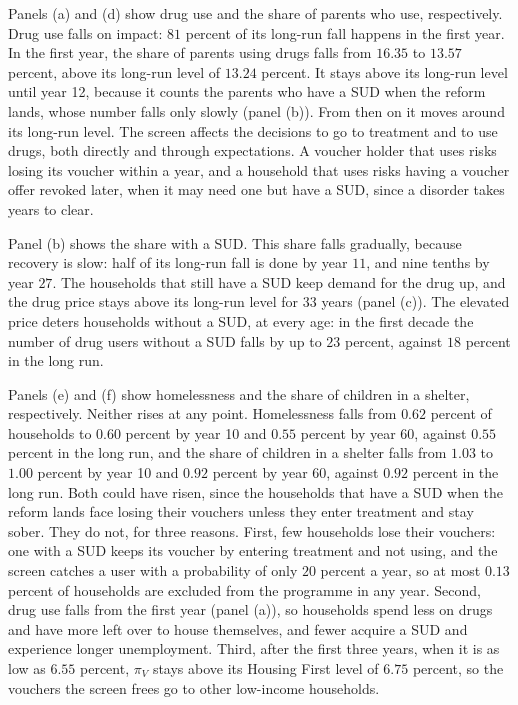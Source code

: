 \documentclass[10pt]{article}
\newif\ifshowupdates \showupdatesfalse
\newcommand{\updnum}[1]{\ifshowupdates{\color{blue}#1}\else#1\fi}
\begin{document}
Panels (a) and (d) show drug use and the share of parents who use, respectively. Drug use falls on impact: \updnum{$81$} percent of its long-run fall happens in
the first year. In the first year, the share of parents using drugs falls from \updnum{$16.35$} to \updnum{$13.57$} percent, \updnum{above} its long-run level of \updnum{$13.24$} percent. \updnum{It stays above its long-run level until year 12, because it counts the parents who have a SUD when the reform lands, whose number falls only slowly (panel (b)). From then on it moves around its long-run level.} The screen affects the decisions to go to treatment and to use drugs, both directly and through expectations. A voucher holder that uses risks losing its voucher within a year, and a household that uses risks having a voucher offer revoked later, when it may need one but have a SUD, since a disorder takes years to clear.

Panel (b) shows the
share with a SUD. This share falls gradually, because recovery is slow: half of its
long-run fall is done by year \updnum{$11$}, and nine tenths by year
\updnum{$27$}. The households that still have a SUD keep demand for the drug up, and the drug price stays
above its long-run level for \updnum{$33$} years (panel (c)). The elevated price deters
households without a SUD, at every age: in the first decade the number of drug users without
a SUD falls by up to \updnum{$23$} percent, against $18$ percent in the
long run. 

Panels (e) and (f) show homelessness and the share of children in a shelter, respectively. Neither rises at any point. Homelessness falls from \updnum{$0.62$} percent of households to \updnum{$0.60$} percent by year 10 and \updnum{$0.55$} percent by year \updnum{$60$}, against \updnum{$0.55$} percent in the long run, and the share of children in a shelter falls from \updnum{$1.03$} to \updnum{$1.00$} percent by year 10 and \updnum{$0.92$} percent by year \updnum{$60$}, against \updnum{$0.92$} percent in the long run. Both could have risen, since the households that have a SUD when the reform lands face losing their vouchers unless they enter treatment and stay sober. They do not, for three reasons. First, few households lose their vouchers: one with a SUD keeps its voucher by entering treatment and not using, and the screen catches a user with a probability of only $20$ percent a year, so at most \updnum{$0.13$} percent of households are excluded from the programme in any year. Second, drug use falls from the first year (panel (a)), so households spend less on drugs and have more left over to house themselves, and fewer acquire a SUD and experience longer unemployment. \updnum{Third, after the first three years, when it is as low as $6.55$ percent, $\pi_V$ stays above its Housing First level of $6.75$ percent, so the vouchers the screen frees go to other low-income households.}
\end{document}
